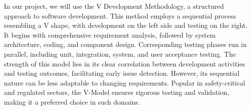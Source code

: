\documentclass[12pt]{book}
\begin{document}

In our project, we will use the V Development Methodology, a structured approach to software development. This method employs a sequential process resembling a V shape, with development on the left side and testing on the right. It begins with comprehensive requirement analysis, followed by system architecture, coding, and component design. Corresponding testing phases run in parallel, including unit, integration, system, and user acceptance testing. The strength of this model lies in its clear correlation between development activities and testing outcomes, facilitating early issue detection. However, its sequential nature can be less adaptable to changing requirements. Popular in safety-critical and regulated sectors, the V-Model ensures rigorous testing and validation, making it a preferred choice in such domains.
\end{document}
